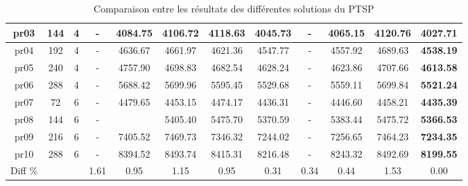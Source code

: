\begin{table}[h!]
\begin{tabular}{|c|c|c|c|c|c|c|c|c|c|c|c|}
    pr03     & 144 & 4  &    -     & 4084.75 & 4106.72 & 4118.63 & 4045.73 &    -     & 4065.15 & 4120.76 & \textbf{4027.71}  \\\hline
    pr04     & 192 & 4  &    -     & 4636.67 & 4661.97 & 4621.36 & 4547.77 &    -     & 4557.92 & 4689.63 & \textbf{4538.19}  \\\hline
    pr05     & 240 & 4  &    -     & 4757.90 & 4698.83 & 4682.54 & 4628.24 &    -     & 4623.86 & 4707.66 & \textbf{4613.58}  \\\hline
    pr06     & 288 & 4  &    -     & 5688.42 & 5699.96 & 5595.45 & 5529.68 &    -     & 5559.11 & 5699.84 & \textbf{5521.24}  \\\hline
    pr07     & 72  & 6  &    -     & 4479.65 & 4453.15 & 4474.17 & 4436.31 &    -     & 4446.60 & 4458.21 & \textbf{4435.39}  \\\hline
    pr08     & 144 & 6  &    -     &         & 5405.40 & 5475.70 & 5370.59 &    -     & 5383.44 & 5475.72 & \textbf{5366.53}  \\\hline
    pr09     & 216 & 6  &    -     & 7405.52 & 7469.73 & 7346.32 & 7244.02 &    -     & 7256.65 & 7464.23 & \textbf{7234.35}  \\\hline
    pr10     & 288 & 6  &   -      & 8394.52 & 8493.74 & 8415.31 & 8216.48 &    -     & 8243.32 & 8492.69 & \textbf{8199.55}  \\\hline
    Diff \%   &        &       & 1.61    & 0.95    & 1.15    & 0.95    & 0.31    & 0.34    & 0.44    & 1.53    & 0.00   \\\hline 
    \end{tabular}
    \caption{Comparaison entre les résultats des différentes solutions du PTSP}
    \label{tab:ptsp-results-comparison}
\end{table}
\FloatBarrier



\medskip

